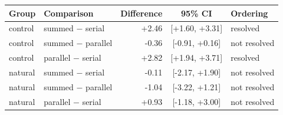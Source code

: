 \begin{tabular}{llrcl}
\hline
Group & Comparison & Difference & 95\% CI & Ordering \\
\hline
control & summed $-$ serial & +2.46 & [+1.60, +3.31] & resolved \\
control & summed $-$ parallel & -0.36 & [-0.91, +0.16] & not resolved \\
control & parallel $-$ serial & +2.82 & [+1.94, +3.71] & resolved \\
natural & summed $-$ serial & -0.11 & [-2.17, +1.90] & not resolved \\
natural & summed $-$ parallel & -1.04 & [-3.22, +1.21] & not resolved \\
natural & parallel $-$ serial & +0.93 & [-1.18, +3.00] & not resolved \\
\hline
\end{tabular}
